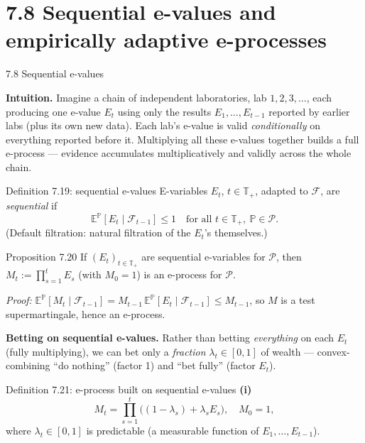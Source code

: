 \documentclass[aspectratio=169,10pt]{beamer}
\begin{document}
\section{7.8 Sequential e-values and empirically adaptive e-processes}

\begin{frame}[allowframebreaks]{7.8 Sequential e-values}

\textbf{Intuition.} Imagine a chain of independent laboratories, lab $1, 2, 3, \dots$, each producing one e-value
$E_t$ using only the results $E_1,\dots,E_{t-1}$ reported by earlier labs (plus its own new data). Each lab's e-value
is valid \emph{conditionally} on everything reported before it. Multiplying all these e-values together builds
a full e-process --- evidence accumulates multiplicatively and validly across the whole chain.

\begin{block}{Definition 7.19: sequential e-values}
E-variables $E_t$, $t \in \mathbb T_+$, adapted to $\mathcal F$, are \emph{sequential} if
$$\mathbb E^{\mathbb P}[E_t \mid \mathcal F_{t-1}] \le 1 \quad \text{for all } t\in\mathbb T_+,\ \mathbb P\in\mathcal P.$$
(Default filtration: natural filtration of the $E_t$'s themselves.)
\end{block}

\begin{block}{Proposition 7.20}
If $(E_t)_{t\in\mathbb T_+}$ are sequential e-variables for $\mathcal P$, then $M_t := \prod_{s=1}^t E_s$
(with $M_0=1$) is an e-process for $\mathcal P$.
\end{block}
\emph{Proof:} $\mathbb E^{\mathbb P}[M_t\mid\mathcal F_{t-1}] = M_{t-1}\,\mathbb E^{\mathbb P}[E_t\mid\mathcal
F_{t-1}] \le M_{t-1}$, so $M$ is a test supermartingale, hence an e-process.

\framebreak

\textbf{Betting on sequential e-values.} Rather than betting \emph{everything} on each $E_t$ (fully multiplying),
we can bet only a \emph{fraction} $\lambda_t \in [0,1]$ of wealth --- convex-combining ``do nothing'' (factor 1)
and ``bet fully'' (factor $E_t$).

\begin{block}{Definition 7.21: e-process built on sequential e-values}
\textbf{(i)} \begin{equation}
M_t = \prod_{s=1}^t \big((1-\lambda_s) + \lambda_s E_s\big), \quad M_0=1,
\tag{7.10}
\end{equation}
where $\lambda_t\in[0,1]$ is predictable (a measurable function of $E_1,\dots,E_{t-1}$).


\end{block}
\end{frame}
\end{document}
